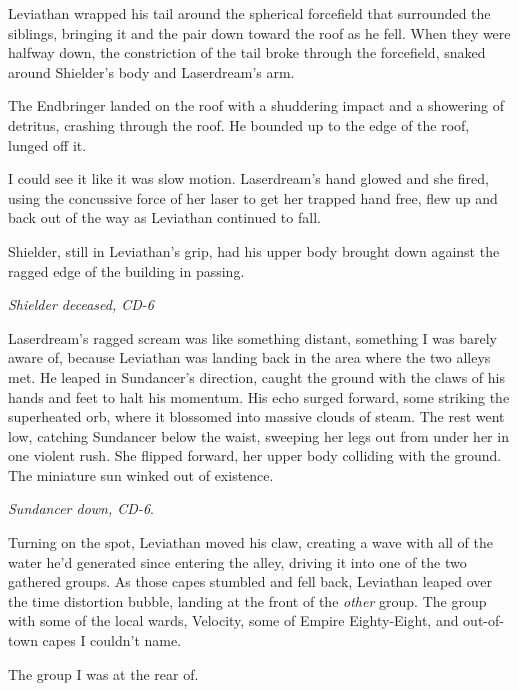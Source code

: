 Leviathan wrapped his tail around the spherical forcefield that surrounded the siblings, bringing it and the pair down toward the roof as he fell.  When they were halfway down, the constriction of the tail broke through the forcefield, snaked around Shielder's body and Laserdream's arm.



The Endbringer landed on the roof with a shuddering impact and a showering of detritus, crashing through the roof.  He bounded up to the edge of the roof, lunged off it.



I could see it like it was slow motion.  Laserdream's hand glowed and she fired, using the concussive force of her laser to get her trapped hand free, flew up and back out of the way as Leviathan continued to fall.



Shielder, still in Leviathan's grip, had his upper body brought down against the ragged edge of the building in passing.



\emph{Shielder deceased, CD-6}



Laserdream's ragged scream was like something distant, something I was barely aware of, because Leviathan was landing back in the area where the two alleys met.  He leaped in Sundancer's direction, caught the ground with the claws of his hands and feet to halt his momentum.  His echo surged forward, some striking the superheated orb, where it blossomed into massive clouds of steam.  The rest went low, catching Sundancer below the waist, sweeping her legs out from under her in one violent rush.  She flipped forward, her upper body colliding with the ground.  The miniature sun winked out of existence.



\emph{Sundancer down, CD-6}.



Turning on the spot, Leviathan moved his claw, creating a wave with all of the water he'd generated since entering the alley, driving it into one of the two gathered groups.  As those capes stumbled and fell back, Leviathan leaped over the time distortion bubble, landing at the front of the \emph{other }group.  The group with some of the local wards, Velocity, some of Empire Eighty-Eight, and out-of-town capes I couldn't name.



The group I was at the rear of.



